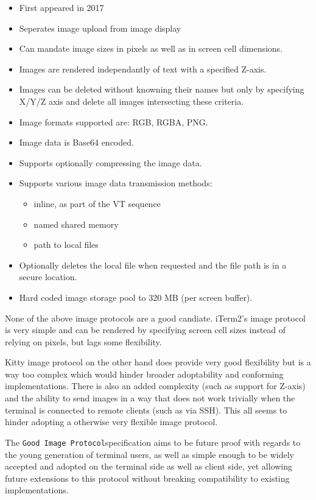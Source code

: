 \documentclass[a4paper]{article}
\newcommand{\code}[1]{\colorbox{light-gray}{\texttt{#1}}}
\newcommand{\GoodImageProtocol}{\code{Good Image Protocol}}
\begin{document}
\begin{itemize}
    \item First appeared in 2017
    \item Seperates image upload from image display
    \item Can mandate image sizes in pixels as well as in screen cell dimensions.
    \item Images are rendered independantly of text with a specified Z-axis.
    \item Images can be deleted without knowning their names but only by specifying X/Y/Z axis
          and delete all images intersecting these criteria.
    \item Image formats supported are: RGB, RGBA, PNG.
    \item Image data is Base64 encoded.
    \item Supports optionally compressing the image data.
    \item Supports various image data transmission methods:
        \begin{itemize}
            \item inline, as part of the VT sequence
            \item named shared memory
            \item path to local files
        \end{itemize}
    \item Optionally deletes the local file when requested and the file path is in a secure location.
    \item Hard coded image storage pool to 320 MB (per screen buffer).
\end{itemize}

None of the above image protocols are a good candiate. iTerm2's image protocol is very simple and
can be rendered by specifying screen cell sizes instead of relying on pixels, but lags some
flexibility.

Kitty image protocol on the other hand does provide very good flexibility but is a way too complex which
would hinder broader adoptability and conforming implementations. There is also an added complexity
(such as support for Z-axis) and the ability to send images in a way that does not work trivially
when the terminal is connected to remote clients (such as via SSH). This all seems to hinder
adopting a otherwise very flexible image protocol.

The \GoodImageProtocol specification aims to be future proof with regards to the young generation
of terminal users, as well as simple enough to be widely accepted and adopted on the terminal side
as well as client side, yet allowing future extensions to this protocol
without breaking compatibility to existing implementations.
\end{document}
